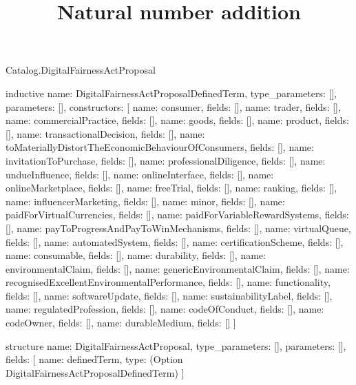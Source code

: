\begin{lexlean}{Catalog.DigitalFairnessActProposal}
\title{Natural number addition}
\begin{semanticmodule}
inductive{
  name: DigitalFairnessActProposalDefinedTerm,
  type_parameters: [],
  parameters: [],
  constructors: [
    {name: consumer, fields: []},
    {name: trader, fields: []},
    {name: commercialPractice, fields: []},
    {name: goods, fields: []},
    {name: product, fields: []},
    {name: transactionalDecision, fields: []},
    {name: toMateriallyDistortTheEconomicBehaviourOfConsumers, fields: []},
    {name: invitationToPurchase, fields: []},
    {name: professionalDiligence, fields: []},
    {name: undueInfluence, fields: []},
    {name: onlineInterface, fields: []},
    {name: onlineMarketplace, fields: []},
    {name: freeTrial, fields: []},
    {name: ranking, fields: []},
    {name: influencerMarketing, fields: []},
    {name: minor, fields: []},
    {name: paidForVirtualCurrencies, fields: []},
    {name: paidForVariableRewardSystems, fields: []},
    {name: payToProgressAndPayToWinMechanisms, fields: []},
    {name: virtualQueue, fields: []},
    {name: automatedSystem, fields: []},
    {name: certificationScheme, fields: []},
    {name: consumable, fields: []},
    {name: durability, fields: []},
    {name: environmentalClaim, fields: []},
    {name: genericEnvironmentalClaim, fields: []},
    {name: recognisedExcellentEnvironmentalPerformance, fields: []},
    {name: functionality, fields: []},
    {name: softwareUpdate, fields: []},
    {name: sustainabilityLabel, fields: []},
    {name: regulatedProfession, fields: []},
    {name: codeOfConduct, fields: []},
    {name: codeOwner, fields: []},
    {name: durableMedium, fields: []}
  ]
}

structure{
  name: DigitalFairnessActProposal,
  type_parameters: [],
  parameters: [],
  fields: [
    {name: definedTerm, type: (Option DigitalFairnessActProposalDefinedTerm)}
  ]
}
\end{semanticmodule}
\end{lexlean}
